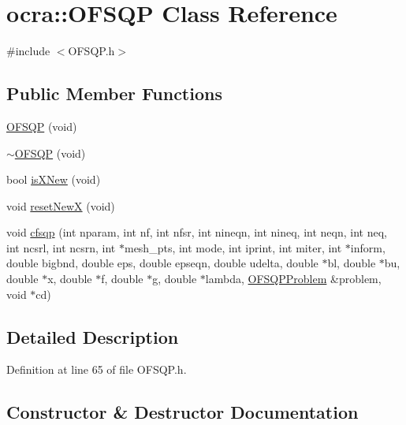\hypertarget{classocra_1_1OFSQP}{}\section{ocra\+:\+:O\+F\+S\+QP Class Reference}
\label{classocra_1_1OFSQP}


{\ttfamily \#include $<$O\+F\+S\+Q\+P.\+h$>$}

\subsection*{Public Member Functions}
\begin{DoxyCompactItemize}
\item 
\hyperlink{classocra_1_1OFSQP_a1621f5bd0da2395a5553e821cba0006e}{O\+F\+S\+QP} (void)
\item 
\hyperlink{classocra_1_1OFSQP_abc15e89ba836e714e10b1589f460e759}{$\sim$\+O\+F\+S\+QP} (void)
\item 
bool \hyperlink{classocra_1_1OFSQP_adf678d1abdee7d5d337cf3698357108f}{is\+X\+New} (void)
\item 
void \hyperlink{classocra_1_1OFSQP_addab1dbba87610a532df2f0a279629be}{reset\+NewX} (void)
\item 
void \hyperlink{classocra_1_1OFSQP_a235aa352025c37af78fc18c28991d18e}{cfsqp} (int nparam, int nf, int nfsr, int nineqn, int nineq, int neqn, int neq, int ncsrl, int ncsrn, int $\ast$mesh\+\_\+pts, int mode, int iprint, int miter, int $\ast$inform, double bigbnd, double eps, double epseqn, double udelta, double $\ast$bl, double $\ast$bu, double $\ast$x, double $\ast$f, double $\ast$g, double $\ast$lambda, \hyperlink{classocra_1_1OFSQPProblem}{O\+F\+S\+Q\+P\+Problem} \&problem, void $\ast$cd)
\end{DoxyCompactItemize}


\subsection{Detailed Description}


Definition at line 65 of file O\+F\+S\+Q\+P.\+h.



\subsection{Constructor \& Destructor Documentation}
